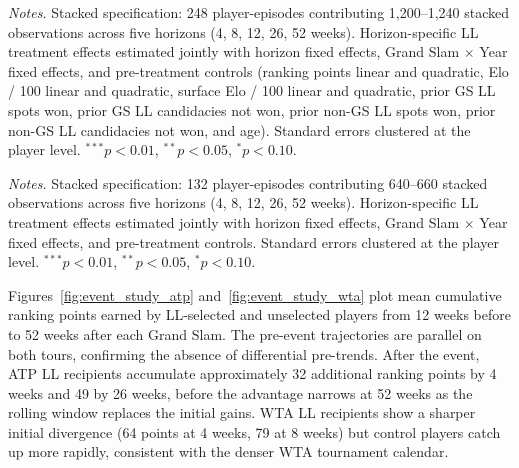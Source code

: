 \begin{table}[htbp]
\centering
\caption{ATP Grand Slam: Post-Episode Dynamic Effects (Stacked Model)}
\label{tab:dynamic_atp}
\begin{threeparttable}
\small

\begin{tablenotes}
\footnotesize
\item \textit{Notes.} Stacked specification: 248 player-episodes contributing 1,200--1,240 stacked observations across five horizons (4, 8, 12, 26, 52 weeks). Horizon-specific LL treatment effects estimated jointly with horizon fixed effects, Grand Slam $\times$ Year fixed effects, and pre-treatment controls (ranking points linear and quadratic, Elo / 100 linear and quadratic, surface Elo / 100 linear and quadratic, prior GS LL spots won, prior GS LL candidacies not won, prior non-GS LL spots won, prior non-GS LL candidacies not won, and age). Standard errors clustered at the player level. $^{***}p<0.01$, $^{**}p<0.05$, $^{*}p<0.10$.
\end{tablenotes}
\end{threeparttable}
\end{table}

\begin{table}[htbp]
\centering
\caption{WTA Grand Slam: Post-Episode Dynamic Effects (Stacked Model)}
\label{tab:dynamic_wta}
\begin{threeparttable}
\small

\begin{tablenotes}
\footnotesize
\item \textit{Notes.} Stacked specification: 132 player-episodes contributing 640--660 stacked observations across five horizons (4, 8, 12, 26, 52 weeks). Horizon-specific LL treatment effects estimated jointly with horizon fixed effects, Grand Slam $\times$ Year fixed effects, and pre-treatment controls. Standard errors clustered at the player level. $^{***}p<0.01$, $^{**}p<0.05$, $^{*}p<0.10$.
\end{tablenotes}
\end{threeparttable}
\end{table}

Figures~\ref{fig:event_study_atp} and~\ref{fig:event_study_wta} plot mean cumulative ranking points earned by LL-selected and unselected players from 12 weeks before to 52 weeks after each Grand Slam. The pre-event trajectories are parallel on both tours, confirming the absence of differential pre-trends. After the event, ATP LL recipients accumulate approximately 32 additional ranking points by 4 weeks and 49 by 26 weeks, before the advantage narrows at 52 weeks as the rolling window replaces the initial gains. WTA LL recipients show a sharper initial divergence (64 points at 4 weeks, 79 at 8 weeks) but control players catch up more rapidly, consistent with the denser WTA tournament calendar.

